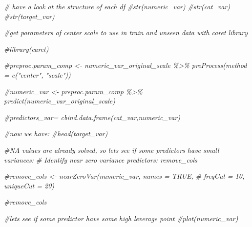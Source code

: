 \documentclass[
]{article}
\newenvironment{Shaded}{\begin{snugshade}}{\end{snugshade}}
\newcommand{\CommentTok}[1]{\textcolor[rgb]{0.56,0.35,0.01}{\textit{#1}}}
\renewcommand{\=}[1]{\stackrel{#1}{=}}
\theoremstyle{definition}
\theoremstyle{remark}
\begin{document}
\begin{Shaded}
\begin{Highlighting}[]
\CommentTok{\# have a look at the structure of each df}
\CommentTok{\#str(numeric\_var)}
\CommentTok{\#str(cat\_var)}
\CommentTok{\#str(target\_var)}
\end{Highlighting}
\end{Shaded}

\begin{Shaded}
\begin{Highlighting}[]
\CommentTok{\#get parameters of center scale to use in train and unseen data with caret library}

\CommentTok{\#library(caret)}

\CommentTok{\#preproc.param\_comp \textless{}{-} numeric\_var\_original\_scale  \%\textgreater{}\% preProcess(method = c("center", "scale"))}

\CommentTok{\#numeric\_var \textless{}{-} preproc.param\_comp \%\textgreater{}\% predict(numeric\_var\_original\_scale)}

\CommentTok{\#predictors\_var= cbind.data.frame(cat\_var,numeric\_var)}
\end{Highlighting}
\end{Shaded}

\begin{Shaded}
\begin{Highlighting}[]
\CommentTok{\#now we have:}
\CommentTok{\#head(target\_var)}
\end{Highlighting}
\end{Shaded}

\begin{Shaded}
\begin{Highlighting}[]
\CommentTok{\#NA values are already solved, so lets see if some predictors have small variances:}
\CommentTok{\# Identify near zero variance predictors: remove\_cols}

\CommentTok{\#remove\_cols \textless{}{-} nearZeroVar(numeric\_var, names = TRUE, }
\CommentTok{\#                           freqCut = 10, uniqueCut = 20)}

\CommentTok{\#remove\_cols}
\end{Highlighting}
\end{Shaded}

\begin{Shaded}
\begin{Highlighting}[]
\CommentTok{\#lets see if some predictor have some high leverage point}
\CommentTok{\#plot(numeric\_var)}
\end{Highlighting}
\end{Shaded}
\end{document}
